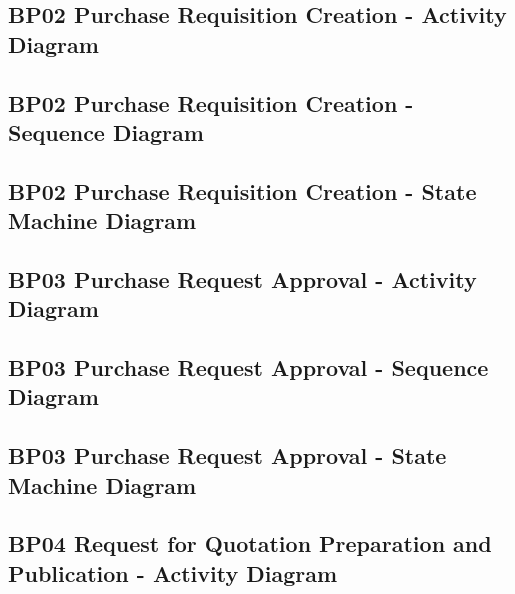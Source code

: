 \documentclass[conference]{IEEEtran}
\begin{document}
\subsection*{BP02 Purchase Requisition Creation - Activity Diagram}



\subsection*{BP02 Purchase Requisition Creation - Sequence Diagram}



\subsection*{BP02 Purchase Requisition Creation - State Machine Diagram}



\subsection*{BP03 Purchase Request Approval - Activity Diagram}



\subsection*{BP03 Purchase Request Approval - Sequence Diagram}



\subsection*{BP03 Purchase Request Approval - State Machine Diagram}



\subsection*{BP04 Request for Quotation Preparation and Publication - Activity Diagram}

\end{document}
